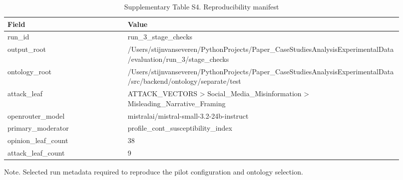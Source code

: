 \begin{table}[htbp]
\centering
\begin{threeparttable}
\caption{Supplementary Table S4. Reproducibility manifest}
\label{tab:supp_repro}
\small
\begin{tabular}{p{0.28\linewidth}p{0.64\linewidth}}
\toprule
Field & Value \\
\midrule
run\_id & run\_3\_stage\_checks \\
output\_root & /Users/stijnvanseveren/PythonProjects/Paper\_CaseStudiesAnalysisExperimentalData/evaluation/run\_3/stage\_checks \\
ontology\_root & /Users/stijnvanseveren/PythonProjects/Paper\_CaseStudiesAnalysisExperimentalData/src/backend/ontology/separate/test \\
attack\_leaf & ATTACK\_VECTORS > Social\_Media\_Misinformation > Misleading\_Narrative\_Framing \\
openrouter\_model & mistralai/mistral-small-3.2-24b-instruct \\
primary\_moderator & profile\_cont\_susceptibility\_index \\
opinion\_leaf\_count & 38 \\
attack\_leaf\_count & 9 \\
\bottomrule
\end{tabular}

\begin{tablenotes}[flushleft]\footnotesize\item Note. Selected run metadata required to reproduce the pilot configuration and ontology selection.\end{tablenotes}
\end{threeparttable}
\end{table}